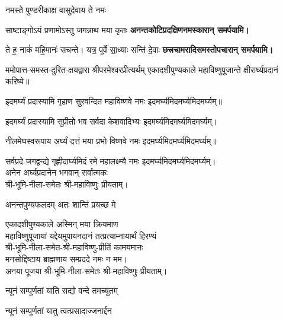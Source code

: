 \begin{center}
{नमस्ते पुण्डरीकाक्ष वासुदेवाय ते नमः}

{साष्टाङ्गोऽयं प्रणामोऽस्तु जगन्नाथ मया कृतः}
\textbf{\devAya{} अनन्तकोटिप्रदक्षिणनमस्कारान् समर्पयामि।}
\medskip

{ते ह॒ नाकं॑ महि॒मानः॑ सचन्ते। यत्र॒ पूर्वे॑ सा॒ध्याः सन्ति॑ दे॒वाः}
\textbf{\devAya{} छत्त्रचामरादिसमस्तोपचारान् समर्पयामि।}
\medskip

ममोपात्त-समस्त-दुरित-क्षयद्वारा श्रीपरमेश्वरप्रीत्यर्थम् एकादशीपुण्यकाले महाविष्णुपूजान्ते क्षीरार्घ्यप्रदानं करिष्ये॥
\medskip

{इदमर्घ्यं प्रदास्यामि गृहाण सुरवन्दित}
\hfill महाविष्णवे नमः इदमर्घ्यमिदमर्घ्यमिदमर्घ्यम्॥\medskip

{इदमर्घ्यं प्रदास्यामि सुप्रीतो भव सर्वदा}
\hfill केशवादिभ्यः इदमर्घ्यमिदमर्घ्यमिदमर्घ्यम्।\medskip

{नीलमेघस्वरूपाय अर्घ्यं दत्तं मया प्रभो}
\hfill विष्णवे नमः इदमर्घ्यमिदमर्घ्यमिदमर्घ्यम्॥\medskip

{सर्वप्रदे जगद्वन्द्ये गृह्णीदार्घ्यमिदं रमे}
\hfill महालक्ष्म्यै नमः इदमर्घ्यमिदमर्घ्यमिदमर्घ्यम्।\\
अनेन अर्घ्यप्रदानेन भगवान् सर्वात्मकः\\ श्री-भूमि-नीला-समेतः श्री-महाविष्णुः प्रीयताम्।\medskip

{अनन्तपुण्यफलदम् अतः शान्तिं प्रयच्छ मे}

एकादशीपुण्यकाले अस्मिन् मया क्रियमाण\\
महाविष्णुपूजायां यद्देयमुपायनदानं तत्प्रत्याम्नायार्थं हिरण्यं\\
श्री-भूमि-नीला-समेत-श्री-महाविष्णु-प्रीतिं कामयमानः\\
मनसोद्दिष्टाय ब्राह्मणाय सम्प्रददे नमः न मम।\\
अनया पूजया श्री-भूमि-नीला-समेतः श्री-महाविष्णुः प्रीयताम्।


{न्यूनं सम्पूर्णतां याति सद्यो वन्दे तमच्युतम्}

{न्यूनं सम्पूर्णतां यातु त्वत्प्रसादाज्जनार्द्दन}
\medskip


\end{center}
